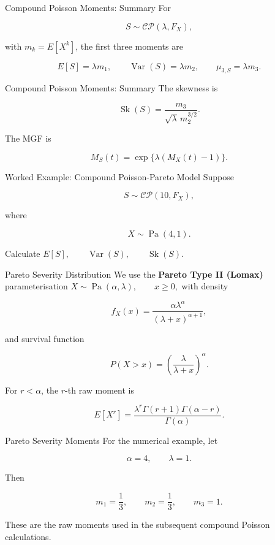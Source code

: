 \documentclass[
  ignorenonframetext,
  aspectratio=169,
]{beamer}
\begin{document}
\begin{frame}{Compound Poisson Moments: Summary}
\protect{}\label{compound-poisson-moments-summary}
For

\[
S\sim\mathcal{CP}(\lambda,F_X),
\]

with \(m_k=E[X^k]\), the first three moments are

\[
\boxed{E[S]=\lambda m_1},
\qquad
\boxed{\operatorname{Var}(S)=\lambda m_2},
\qquad
\boxed{\mu_{3,S}=\lambda m_3}.
\]
\end{frame}

\begin{frame}{Compound Poisson Moments: Summary}
\protect{}\label{compound-poisson-moments-summary-1}
The skewness is

\[
\boxed{
\operatorname{Sk}(S)
=
\frac{m_3}{\sqrt{\lambda}\,m_2^{3/2}}
}.
\]

The MGF is

\[
\boxed{
M_S(t)=\exp\{\lambda(M_X(t)-1)\}.
}
\]
\end{frame}

\begin{frame}{Worked Example: Compound Poisson-Pareto Model}
\protect{}\label{worked-example-compound-poisson-pareto-model}
Suppose

\[
S\sim\mathcal{CP}(10,F_X),
\]

where

\[
X\sim\operatorname{Pa}(4,1).
\]

Calculate
\(E[S],\qquad\operatorname{Var}(S),\qquad\operatorname{Sk}(S).\)
\end{frame}

\begin{frame}{Pareto Severity Distribution}
\protect{}\label{pareto-severity-distribution}
We use the \textbf{Pareto Type II (Lomax)} parameterisation
\(X\sim\operatorname{Pa}(\alpha,\lambda),\qquad x\geq0,\) with density

\[
f_X(x)
=
\frac{\alpha\lambda^\alpha}{(\lambda+x)^{\alpha+1}},
\]

and survival function

\[
P(X>x)
=
\left(\frac{\lambda}{\lambda+x}\right)^\alpha.
\]

For \(r<\alpha\), the \(r\)-th raw moment is

\[
\boxed{
E[X^r]
=
\frac{\lambda^r\Gamma(r+1)\Gamma(\alpha-r)}
{\Gamma(\alpha)}
}.
\]
\end{frame}

\begin{frame}{Pareto Severity Moments}
\protect{}\label{pareto-severity-moments}
For the numerical example, let

\[
\alpha=4,\qquad \lambda=1.
\]

Then

\[
\boxed{
m_1=\frac13,
\qquad
m_2=\frac13,
\qquad
m_3=1.
}
\]

These are the raw moments used in the subsequent compound Poisson
calculations.
\end{frame}
\end{document}
